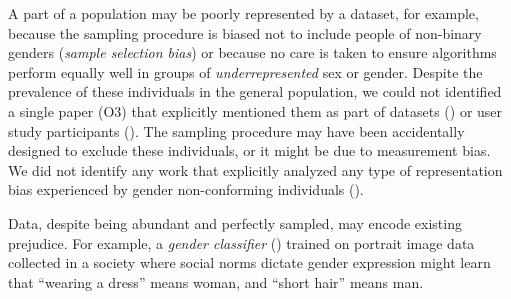 \documentclass[nonacm,sigconf,review,balance=false]{acmart}
\begin{document}
 A part of a population may be poorly represented by a dataset, for example, because the sampling procedure is biased not to include people of non-binary genders (\emph{sample selection bias}) or because no care is taken to ensure algorithms perform equally well in  groups of \emph{underrepresented} sex or gender. Despite the prevalence of these individuals in the general population, we could not identified a single paper (O3) that explicitly mentioned them as part of datasets (\dataset) or user study participants (\userstudy). The sampling procedure may have been accidentally designed to exclude these individuals, or it might be due to measurement bias. We did not identify any work that explicitly analyzed any type of representation bias experienced by gender non-conforming individuals (\binary).

 Data, despite being abundant and perfectly sampled, may encode existing prejudice. For example, a \emph{gender classifier} (\classifier) trained on portrait image data collected in a society where social norms dictate gender expression might learn that ``wearing a dress'' means woman, and ``short hair'' means man.
\end{document}
